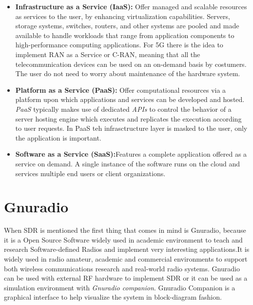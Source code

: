 \begin{itemize}

    \item \textbf{Infrastructure as a Service (IaaS):} Offer managed and
    scalable resources as services to the user, by enhancing virtualization
    capabilities. Servers, storage systems, switches, routers, and other systems
    are pooled and made available to handle workloads that range from
    application components to high-performance computing applications. For 5G
    there is the idea to implement RAN as a Service or C-RAN, meaning that all
    the telecommunication devices can be used on an on-demand basis by
    costumers. The user do not need to worry about maintenance of the hardware
    system.

    \item \textbf{Platform as a Service (PaaS):} Offer computational resources
    via a platform upon which applications and services can be developed and
    hosted. \textit{PaaS} typically makes use of dedicated \textit{APIs} to
    control the behavior of a server hosting engine which executes and
    replicates the execution according to user requests. In PaaS teh
    infrasctructure layer is masked to the user, only the application is
    important.

    \item \textbf{Software as a Service (SaaS):}Features a complete application
    offered as a service on demand. A single instance of the software runs on the
    cloud and services multiple end users or client organizations.

\end{itemize}


\section{Gnuradio}
\label{sdr:gnuradio}

When SDR is mentioned the first thing that comes in mind is Gnuradio, because
it is a Open Source Software widely used in academic environment to teach and
research Software-defined Radios and implement very interesting applications.It
is widely used in radio amateur, academic and commercial environments to
support both wireless communications research and real-world radio systems.
Gnuradio can be used with external RF hardware to implement SDR or it can be
used as a simulation environment with \textit{Gnuradio companion}. Gnuradio
Companion is a graphical interface to help visualize the system in
block-diagram fashion.

